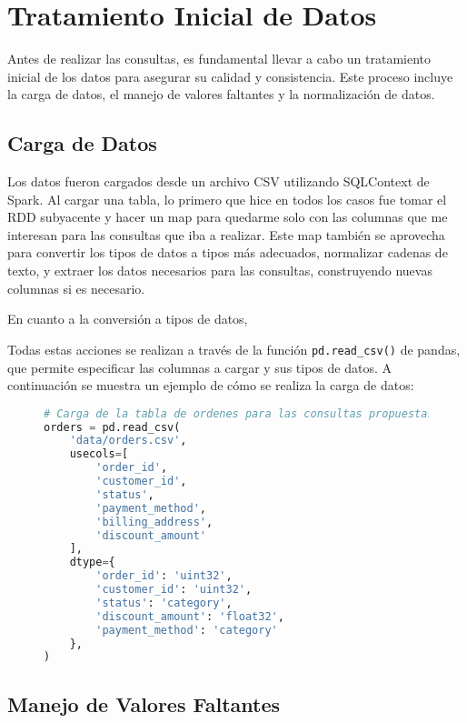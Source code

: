 \section{Tratamiento Inicial de Datos}
\label{sec:tratamiento_inicial_de_datos}

Antes de realizar las consultas, es fundamental llevar a cabo un tratamiento inicial de los datos para asegurar su calidad y consistencia. Este proceso incluye la carga de datos, el manejo de valores faltantes y la normalización de datos.

\subsection{Carga de Datos}

Los datos fueron cargados desde un archivo CSV utilizando SQLContext de Spark. Al cargar una tabla, lo primero que hice en todos los casos fue tomar el RDD subyacente y hacer un map para quedarme solo con las columnas que me interesan para las consultas que iba a realizar. Este map también se aprovecha para convertir los tipos de datos a tipos más adecuados, normalizar cadenas de texto, y extraer los datos necesarios para las consultas, construyendo nuevas columnas si es necesario.

En cuanto a la conversión a tipos de datos, 

Todas estas acciones se realizan a través de la función \texttt{pd.read\_csv()} de pandas, que permite especificar las columnas a cargar y sus tipos de datos. A continuación se muestra un ejemplo de cómo se realiza la carga de datos:

\begin{figure}[H]
\begin{lstlisting}[language=Python, xleftmargin=70pt, xrightmargin=70pt]
# Carga de la tabla de ordenes para las consultas propuestas por el enunciado
orders = pd.read_csv(
    'data/orders.csv',
    usecols=[
        'order_id',
        'customer_id',
        'status',
        'payment_method',
        'billing_address',
        'discount_amount'
    ],
    dtype={
        'order_id': 'uint32',
        'customer_id': 'uint32',
        'status': 'category',
        'discount_amount': 'float32',
        'payment_method': 'category'
    },
)
\end{lstlisting}
\end{figure}

\subsection{Manejo de Valores Faltantes}

